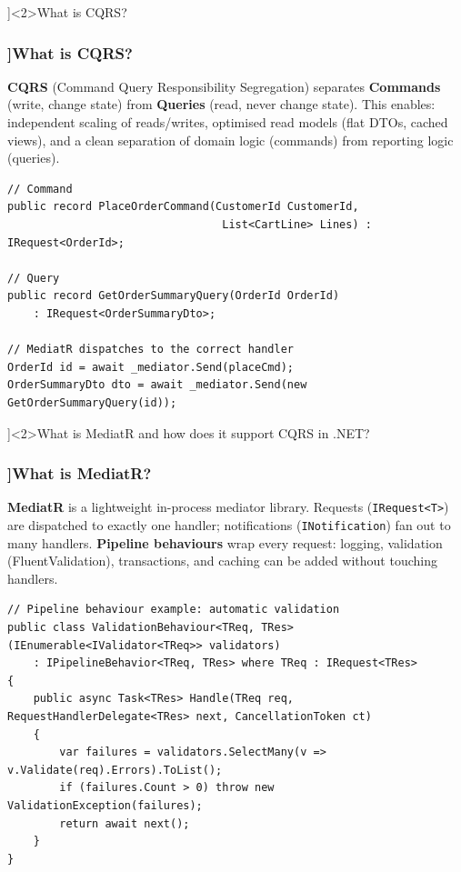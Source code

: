 \QuestionSlide[\CategoryBadge[DDDColor!20]{DDD \& CQRS}]<2>{What is CQRS?}

\begin{frame}[fragile]
  \frametitle{\AnswerTitle[\CategoryBadge[DDDColor!20]{DDD \& CQRS}]{What is CQRS?}}

  {\footnotesize
  \textbf{CQRS} (Command Query Responsibility Segregation) separates \textbf{Commands} (write, change state) from \textbf{Queries} (read, never change state). This enables: independent scaling of reads/writes, optimised read models (flat DTOs, cached views), and a clean separation of domain logic (commands) from reporting logic (queries).
  }

  \begin{verbatim}
// Command
public record PlaceOrderCommand(CustomerId CustomerId,
                                 List<CartLine> Lines) : IRequest<OrderId>;

// Query
public record GetOrderSummaryQuery(OrderId OrderId)
    : IRequest<OrderSummaryDto>;

// MediatR dispatches to the correct handler
OrderId id = await _mediator.Send(placeCmd);
OrderSummaryDto dto = await _mediator.Send(new GetOrderSummaryQuery(id));
  \end{verbatim}
\end{frame}

\QuestionSlide[\CategoryBadge[DDDColor!20]{DDD \& CQRS}]<2>{What is MediatR and how does it support CQRS in .NET?}

\begin{frame}[fragile]
  \frametitle{\AnswerTitle[\CategoryBadge[DDDColor!20]{DDD \& CQRS}]{What is MediatR?}}

  {\footnotesize
  \textbf{MediatR} is a lightweight in-process mediator library. Requests (\texttt{IRequest<T>}) are dispatched to exactly one handler; notifications (\texttt{INotification}) fan out to many handlers. \textbf{Pipeline behaviours} wrap every request: logging, validation (FluentValidation), transactions, and caching can be added without touching handlers.
  }

  \begin{verbatim}
// Pipeline behaviour example: automatic validation
public class ValidationBehaviour<TReq, TRes>(IEnumerable<IValidator<TReq>> validators)
    : IPipelineBehavior<TReq, TRes> where TReq : IRequest<TRes>
{
    public async Task<TRes> Handle(TReq req, RequestHandlerDelegate<TRes> next, CancellationToken ct)
    {
        var failures = validators.SelectMany(v => v.Validate(req).Errors).ToList();
        if (failures.Count > 0) throw new ValidationException(failures);
        return await next();
    }
}
  \end{verbatim}
\end{frame}

